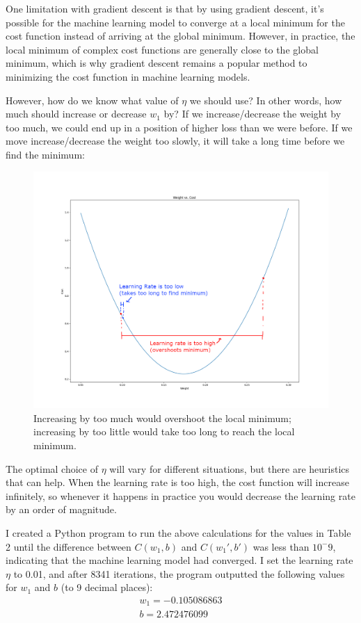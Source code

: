 \documentclass[12pt]{article}
\begin{document}
One limitation with gradient descent is that by using gradient descent, it's possible for the machine learning model to converge at a local minimum for the cost function instead of arriving at the global minimum. However, in practice, the local minimum of complex cost functions are generally close to the global minimum, which is why gradient descent remains a popular method to minimizing the cost function in machine learning models.

However, how do we know what value of $\eta$ we should use? In other words, how much should increase or decrease $w_1$ by? If we increase/decrease the weight by too much, we could end up in a position of higher loss than we were before. If we move increase/decrease the weight too slowly, it will take a long time before we find the minimum:

\begin{figure}[H]
	\centering
	\caption{Increasing by too much would overshoot the local minimum; increasing by too little would take too long to reach the local minimum.}
	\includegraphics[width=\linewidth]{learning-rate.png}
\end{figure}

The optimal choice of $\eta$ will vary for different situations, but there are heuristics that can help. When the learning rate is too high, the cost function will increase infinitely, so whenever it happens in practice you would decrease the learning rate by an order of magnitude.

I created a Python program to run the above calculations for the values in Table 2 until the difference between $C(w_1, b)$ and $C(w_1', b')$ was less than $10^-9$, indicating that the machine learning model had converged. I set the learning rate $\eta$ to 0.01, and after 8341 iterations, the program outputted the following values for $w_1$ and $b$ (to 9 decimal places):
\begin{align}
	w_1 = -0.105086863 \\
	b = 2.472476099
\end{align}
\end{document}
